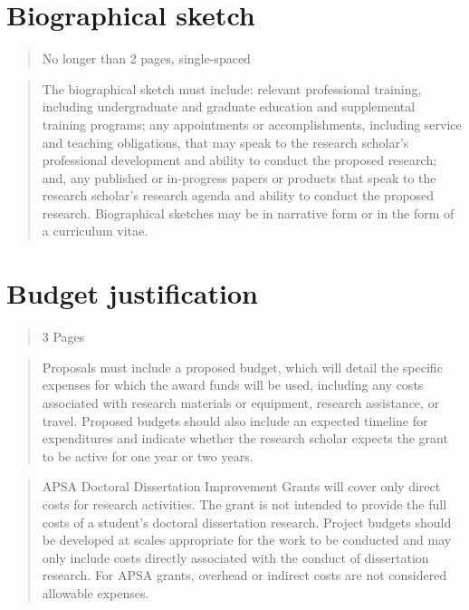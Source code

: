 \documentclass[
      12pt,
        ]{article}
\begin{document}
\newpage

\hypertarget{biographical-sketch}{%
\section{Biographical sketch}\label{biographical-sketch}}

\begin{quote}
No longer than 2 pages, single-spaced
\end{quote}

\begin{quote}
The biographical sketch must include: relevant professional training, including undergraduate and graduate education and supplemental training programs; any appointments or accomplishments, including service and teaching obligations, that may speak to the research scholar's professional development and ability to conduct the proposed research; and, any published or in-progress papers or products that speak to the research scholar's research agenda and ability to conduct the proposed research. Biographical sketches may be in narrative form or in the form of a curriculum vitae.
\end{quote}

\newpage

\hypertarget{budget-justification}{%
\section{Budget justification}\label{budget-justification}}

\begin{quote}
3 Pages
\end{quote}

\begin{quote}
Proposals must include a proposed budget, which will detail the specific expenses for which the award funds will be used, including any costs associated with research materials or equipment, research assistance, or travel. Proposed budgets should also include an expected timeline for expenditures and indicate whether the research scholar expects the grant to be active for one year or two years.
\end{quote}

\begin{quote}
APSA Doctoral Dissertation Improvement Grants will cover only direct costs for research activities. The grant is not intended to provide the full costs of a student's doctoral dissertation research. Project budgets should be developed at scales appropriate for the work to be conducted and may only include costs directly associated with the conduct of dissertation research. For APSA grants, overhead or indirect costs are not considered allowable expenses.
\end{quote}
\end{document}
